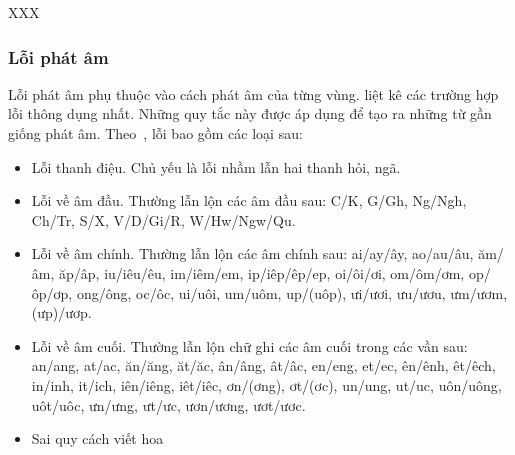 \documentclass[a4paper,oneside,14pt]{extbook} %
\newcommand{\note}[1]{\underline{#1}}
\begin{document}


XXX %

\subsubsection{Lỗi phát âm}
\label{sec:realword:recover:sound}

Lỗi phát âm phụ thuộc vào cách phát âm của từng
vùng. \cite{LoiChinhTa} liệt kê các trường hợp lỗi thông dụng
nhất. Những quy tắc này được áp dụng để tạo ra những từ gần giống phát
âm.
Theo~\cite{LoiChinhTa}, lỗi bao gồm các loại sau:
\begin{itemize}
\item Lỗi thanh điệu. Chủ yếu là lỗi nhầm lẫn hai thanh hỏi, ngã.
\item Lỗi về âm đầu. Thường lẫn lộn các âm đầu sau: C/K, G/Gh, Ng/Ngh,
  Ch/Tr, S/X, V/D/Gi/R, W/Hw/Ngw/Qu.
\item Lỗi về âm chính. Thường lẫn lộn các âm chính sau: ai/ay/ây,
  ao/au/âu, ăm/âm, ăp/âp, iu/iêu/êu, im/iêm/em, ip/iêp/êp/ep,
  oi/ôi/ơi, om/ôm/ơm, op/ôp/ơp, ong/ông, oc/ôc, ui/uôi, um/uôm, up/(uôp),
  ưi/ươi, ưu/ươu, ưm/ươm, (ưp)/ươp.
\item Lỗi về âm cuối. Thường lẫn lộn chữ ghi các âm cuối trong các vần
  sau:
  an/ang, at/ac, ăn/ăng, ăt/ăc, ân/âng, ât/âc, en/eng, et/ec, ên/ênh,
  êt/êch, in/inh, it/ich, iên/iêng, iêt/iêc, ơn/(ơng), ơt/(ơc),
  un/ung, ut/uc, uôn/uông, uôt/uôc, ưn/ưng, ưt/ưc, ươn/ương, ươt/ươc.
\item Sai quy cách viết hoa
\end{itemize}
\end{document}
